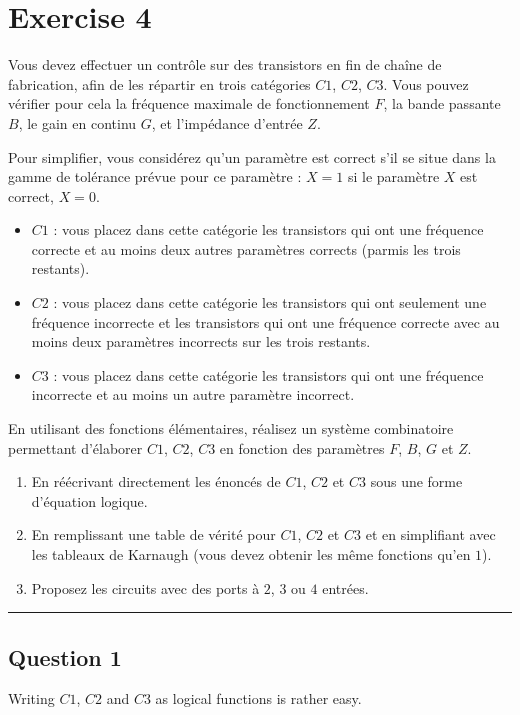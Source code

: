 \documentclass[a4paper,10pt]{article}
\def\centralruler{\begin{center}\rule{5cm}{.1pt}\end{center}}
\begin{document}
\section{Exercise 4}
Vous devez effectuer un contrôle sur des transistors en fin de chaîne de fabrication, afin de les répartir en trois catégories $C1$, $C2$, $C3$. Vous pouvez vérifier pour cela la fréquence maximale de fonctionnement $F$, la bande passante $B$, le gain en continu $G$, et l'impédance d'entrée $Z$.

Pour simplifier, vous considérez qu'un paramètre est correct s'il se situe dans la gamme de tolérance prévue pour ce paramètre : $X=1$ si le paramètre $X$ est correct, $X=0$.
\begin{itemize}
	\item $C1$ : vous placez dans cette catégorie les transistors qui ont une fréquence correcte et au moins deux autres paramètres corrects (parmis les trois restants).
	\item $C2$ : vous placez dans cette catégorie les transistors qui ont seulement une fréquence incorrecte et les transistors qui ont une fréquence correcte avec au moins deux paramètres incorrects sur les trois restants.
	\item $C3$ : vous placez dans cette catégorie les transistors qui ont une fréquence incorrecte et au moins un autre paramètre incorrect.
\end{itemize}

En utilisant des fonctions élémentaires, réalisez un système combinatoire permettant d'élaborer $C1$, $C2$, $C3$ en fonction des paramètres $F$, $B$, $G$ et $Z$.
\begin{enumerate}
	\item En réécrivant directement les énoncés de $C1$, $C2$ et $C3$ sous une forme d'équation logique.
	\item En remplissant une table de vérité pour $C1$, $C2$ et $C3$ et en simplifiant avec les tableaux de Karnaugh (vous devez obtenir les même fonctions qu'en $1$).
	\item Proposez les circuits avec des ports à $2$, $3$ ou $4$ entrées.
\end{enumerate}

\centralruler

\subsection{Question 1}
Writing $C1$, $C2$ and $C3$ as logical functions is rather easy.
\end{document}
